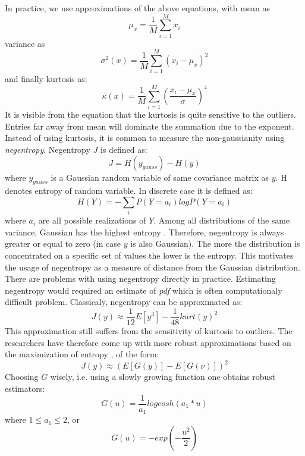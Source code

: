 \documentclass{article}
\begin{document}
In practice, we use approximations of the above equations, with mean as
\begin{equation}
    \mu_x = \frac{1}{M}\sum_{i=1}^{M}x_i
\end{equation}
variance as
\begin{equation}
    \sigma^2(x) = \frac{1}{M}\sum_{i=1}^{M}(x_i - \mu_x)^2
\end{equation}
and finally kurtosis as:
\begin{equation}
    \kappa(x) = \frac{1}{M}\sum_{i=1}^{M}\left(\frac{x_i - \mu_x}{\sigma}\right)^4
\end{equation}
It is visible from the equation that the kurtosis is quite sensitive to the outliers. Entries far away from mean will dominate the summation due to the exponent. Instead of using kurtosis, it is common to measure the non-gaussianity using \textit{negentropy}. Negentropy $J$ is defined as:
\begin{equation}
    J = H(y_{gauss}) - H(y)
\end{equation}
where $y_{gauss}$ is a Gaussian random variable of same covariance matrix as $y$. H denotes entropy of random variable. In discrete case it is defined as:
\begin{equation}
    H(Y) = -\sum_{i}P(Y=a_i)logP(Y=a_i)
\end{equation}
where $a_i$ are all possible realizations of $Y$. Among all distributions of the same variance, Gaussian has the highest entropy \cite{Cover1991}. Therefore, negentropy is always greater or equal to zero (in case $y$ is also Gaussian). The more the distribution is concentrated on a specific set of values the lower is the entropy. This motivates the usage of negentropy as a measure of distance from the Gaussian distribution. There are problems with using negentropy directly in practice. Estimating negentropy would required an estimate of \textit{pdf} which is often computationaly difficult problem.
Classicaly, negentropy can be approximated as:
\begin{equation}
    J(y) \approx \frac{1}{12}E\left[y^3\right] - \frac{1}{48}kurt(y)^2
\end{equation}
This approximation still suffers from the sensitivity of kurtosis to outliers. The researchers have therefore come up with more robust approximations based on the maximization of entropy \cite{Langlois2010}, of the form:
\begin{equation}
    J(y) \approx (E\left[G(y)\right] -  E\left[G(\nu)\right])^2
\end{equation}
Choosing $G$ wisely, i.e. using a slowly growing function one obtains robust estimators:
\begin{equation}
    G(u) = \frac{1}{a_1}log cosh (a_1 * u)
\end{equation}
where  $1 \leq a_1 \leq 2$, or
\begin{equation}
    G(u) = -exp (-\frac{u^2}{2})
\end{equation}
\end{document}
